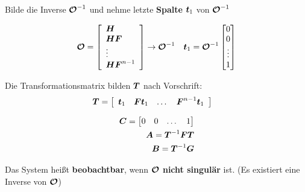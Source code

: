\begin{tcolorbox}[colback=white!10!white,colframe=blue!70!black,title=KOCHREZEPT: Beobachtungsnormalform]
    
    \tcblower
    Bilde die Inverse $\boldsymbol{\mathcal{O}}^{-1}$ und nehme letzte \textbf{Spalte} $\boldsymbol{t}_1$ von $\boldsymbol{\mathcal{O}}^{-1}$
        
        \begin{align*}
        \boldsymbol{\mathcal{O}} &= 
        \left[\begin{array}{l}
        \boldsymbol{H}\\
        \boldsymbol{HF}\\
        \vdots\\
        \boldsymbol{HF}^{n-1}
        \end{array}\right] \rightarrow \boldsymbol{\mathcal{O}}^{-1} &      \boldsymbol{t}_1 = \boldsymbol{\mathcal{O}}^{-1}     \begin{bmatrix}
        0 \\ 0 \\ \vdots \\ 1
        \end{bmatrix}
        \end{align*}

    Die Transformationsmatrix bilden $\boldsymbol{T}$ nach Vorschrift:
    \begin{align*}
    \boldsymbol{T} &= \left[\begin{array}{llll}
    \boldsymbol{t}_1 & \boldsymbol{Ft}_1 & \dots & \boldsymbol{F}^{n-1}\boldsymbol{t}_1
    \end{array}\right]
    \end{align*}
    
    \begin{tcolorbox}[colback=white!10!white,colframe=blue!70!black,title=Umrechnungsvorschrift in Beobachtungsnormalform]
        \begin{align*}
        \boldsymbol{C} = \begin{bmatrix}
        0 & 0& \dots &1
        \end{bmatrix} 
        \\
         \boldsymbol{A} = \boldsymbol{T}^{-1}\boldsymbol{FT} 
        \\
            \boldsymbol{B} = \boldsymbol{T}^{-1}\boldsymbol{G}
        \end{align*}
    \end{tcolorbox}
    
    \begin{tcolorbox}[colback=white!10!white,colframe=gray!70!black,title=Beobachtbarkeit]
        Das System heißt \textbf{beobachtbar}, wenn $\boldsymbol{\mathcal{O}}$ \textbf{nicht singulär} ist. (Es existiert eine Inverse von $\boldsymbol{\mathcal{O}}$)
    \end{tcolorbox}
\end{tcolorbox}
